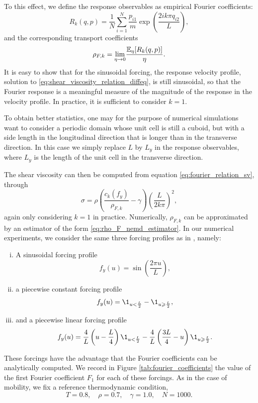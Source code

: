 To this effect, we define the response observables as empirical Fourier coefficients:
\begin{equation}
    \label{eq:nemd_shear_viscosity_response}
    R_k(q,p)=\frac{1}N\sum_{i=1}^N\frac{p_{i1}}{m}\exp\left(\frac{2ik\pi q_{i2}}{L}\right),
\end{equation}
and the corresponding transport coefficients
\begin{equation}
    \label{eq:shear_viscosity_tranpsort_coefficient}
    \rho_{F,k}=\underset{\eta\to 0}{\lim}\frac{\mathbb{E}_\eta[R_k(q,p)]}{\eta}.
\end{equation}
It is easy to show that for the sinusoidal forcing, the response velocity profile, solution to \eqref{eq:shear_viscosity_relation_diffeq}, is still sinusoidal, so that the Fourier response is a meaningful measure of the magnitude of the response in the velocity profile.
In practice, it is sufficient to consider $k=1$.
\begin{remark}
    To obtain better statistics, one may for the purpose of numerical simulations want to consider a periodic domain whose unit cell is still a cuboid, but with a side length in the longitudinal direction that is longer than in the transverse direction.
    In this case we simply replace $L$ by $L_y$ in the response observables, where $L_y$ is the length of the unit cell in the transverse direction.
\end{remark}
The shear viscosity can then be computed from equation \eqref{eq:fourier_relation_sv}, through
\begin{equation}
    \label{eq:shear_viscosity_nemd_estimator}
    \sigma=\rho\left(\frac{c_k(f_y)}{\rho_{F,k}}-\gamma\right)\left(\frac{L}{2k\pi}\right)^2,
\end{equation}
again only considering $k=1$ in practice. Numerically, $\rho_{F,k}$ can be approximated by an estimator of the form \eqref{eq:rho_F_nemd_estimator}.
In our numerical experiments, we consider the same three forcing profiles as in \cite{JS12}, namely:
\begin{enumerate}[(i)]
    \item A sinusoidal forcing profile \[f_y(u)=\sin\left(\frac{2\pi u}{L}\right),\]
    \item a piecewise constant forcing profile \[f_y(u)=\1_{u<\frac{L}2}-\1_{u\geq \frac{L}2},\]
    \item and a piecewise linear forcing profile \[f_y(u)=\frac{4}{L}\left(u-\frac{L}4\right)\1_{u<\frac{L}2}-\frac{4}L\left(\frac{3L}4-u\right)\1_{u\geq \frac{L}2}.\]
\end{enumerate}
These forcings have the advantage that the Fourier coefficients can be analytically computed. We record in Figure \ref{tab:fourier_coefficients} the value of the first Fourier coefficient $F_1$ for each of these forcings.
As in the case of mobility, we fix a reference thermodynamic condition,
\begin{equation}
    \label{eq:reference_thermo_condition_sv}
    T=0.8,\quad \rho=0.7,\quad \gamma=1.0,\quad N=1000.
\end{equation}

